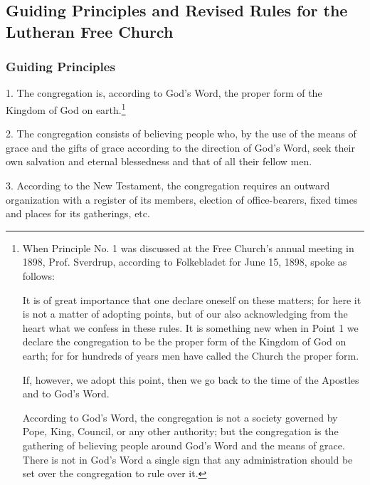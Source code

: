 
\subsection{Guiding Principles and Revised Rules for the Lutheran Free Church}

\subsubsection{Guiding Principles}

1. The congregation is, according to God’s Word, the proper form of the Kingdom of God on earth.\footnote{When Principle No. 1 was discussed at the Free Church’s annual meeting in 1898, Prof. Sverdrup, according to Folkebladet for June 15, 1898, spoke as follows:

It is of great importance that one declare oneself on these matters; for here it is not a matter of adopting points, but of our also acknowledging from the heart what we confess in these rules. It is something new when in Point 1 we declare the congregation to be the proper form of the Kingdom of God on earth; for for hundreds of years men have called the Church the proper form.

If, however, we adopt this point, then we go back to the time of the Apostles and to God’s Word.

According to God’s Word, the congregation is not a society governed by Pope, King, Council, or any other authority; but the congregation is the gathering of believing people around God’s Word and the means of grace. There is not in God’s Word a single sign that any administration should be set over the congregation to rule over it.}

2. The congregation consists of believing people who, by the use of the means of grace and the gifts of grace according to the direction of God’s Word, seek their own salvation and eternal blessedness and that of all their fellow men.

3. According to the New Testament, the congregation requires an outward organization with a register of its members, election of office-bearers, fixed times and places for its gatherings, etc.

